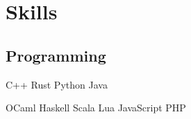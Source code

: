 \documentclass[]{resume}
\begin{document}
\begin{minipage}[t]{0.33\textwidth}
\sectionsep


\section{Skills}

\subsection{Programming}

C++ \textbullet{} Rust \textbullet{} Python \textbullet{} Java

OCaml \textbullet{} Haskell \textbullet{} Scala \textbullet{} Lua \textbullet{} JavaScript \textbullet{} PHP

\sectionsep

%
%

\end{minipage}
\hfill
\end{document}
